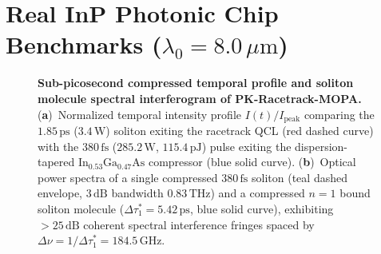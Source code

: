 \documentclass[11pt,letterpaper]{article}
\begin{document}
\section{Real InP Photonic Chip Benchmarks ($\lambda_0 = 8.0\,\mu\mathrm{m}$)}
\label{sec:real_devices}

\begin{table}[t!]
\centering
\caption{Benchmark comparison of mid-IR ($\lambda_0 = 8.0\,\mu\mathrm{m}$) soliton ring QCL platforms: the free-running ring QCL~\cite{Piccardo2020,Meng2022}, the externally driven racetrack QCL~\cite{Kazakov2025,ColumboRoadmap2025}, and our monolithic four-stage design \textbf{PK-Racetrack-MOPA}.}
\vspace{6pt}
\label{tab:real_soliton_devices}
\end{table}

\begin{figure}[t!]
\centering
\resizebox{0.97\textwidth}{!}{}
\caption{\textbf{Sub-picosecond compressed temporal profile and soliton molecule spectral interferogram of PK-Racetrack-MOPA.} (\textbf{a})~Normalized temporal intensity profile $I(t)/I_{\mathrm{peak}}$ comparing the $1.85\,\mathrm{ps}$ ($3.4\,\mathrm{W}$) soliton exiting the racetrack QCL (red dashed curve) with the $380\,\mathrm{fs}$ ($285.2\,\mathrm{W}$, $115.4\,\mathrm{pJ}$) pulse exiting the dispersion-tapered $\mathrm{In}_{0.53}\mathrm{Ga}_{0.47}\mathrm{As}$ compressor (blue solid curve). (\textbf{b})~Optical power spectra of a single compressed $380\,\mathrm{fs}$ soliton (teal dashed envelope, $3\,\mathrm{dB}$ bandwidth $0.83\,\mathrm{THz}$) and a compressed $n = 1$ bound soliton molecule ($\Delta\tau_1^* = 5.42\,\mathrm{ps}$, blue solid curve), exhibiting $>25\,\mathrm{dB}$ coherent spectral interference fringes spaced by $\Delta\nu = 1/\Delta\tau_1^* = 184.5\,\mathrm{GHz}$.}
\label{fig:compressed_pulse}
\end{figure}
\end{document}
